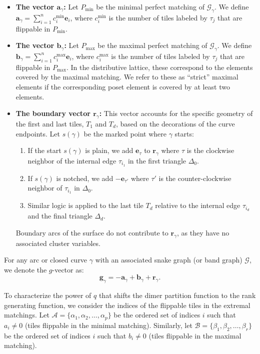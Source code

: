 \documentclass[11pt]{amsart}
\theoremstyle{definition}
\theoremstyle{remark}
\numberwithin{equation}{section}
\begin{document}
\begin{itemize}
    \item \textbf{The vector $\mathbf{a}_\gamma$:} Let $P_{\text{min}}$ be the minimal perfect matching of $\mathcal{G}_\gamma$. We define $\mathbf{a}_\gamma = \sum_{i=1}^n c_i^{\min} \mathbf{e}_i$, where $c_i^{\min}$ is the number of tiles labeled by $\tau_j$ that are flippable in $P_{\text{min}}$.

    \item \textbf{The vector $\mathbf{b}_\gamma$:} Let $P_{\text{max}}$ be the maximal perfect matching of $\mathcal{G}_\gamma$. We define $\mathbf{b}_\gamma = \sum_{i=1}^n c_i^{\max} \mathbf{e}_i$, where $c_i^{\max}$ is the number of tiles labeled by $\tau_j$ that are flippable in $P_{\text{max}}$. In the distributive lattice, these correspond to the elements covered by the maximal matching. We refer to these as ``strict'' maximal elements if the corresponding poset element is covered by at least two elements.

    \item \textbf{The boundary vector $\mathbf{r}_\gamma$:} This vector accounts for the specific geometry of the first and last tiles, $T_1$ and $T_d$, based on the decorations of the curve endpoints. Let $s(\gamma)$ be the marked point where $\gamma$ starts:
    \begin{enumerate}
        \item If the start $s(\gamma)$ is plain, we add $\mathbf{e}_\tau$ to $\mathbf{r}_\gamma$ where $\tau$ is the clockwise neighbor of the internal edge $\tau_{i_1}$ in the first triangle $\Delta_0$.
        \item If $s(\gamma)$ is notched, we add $-\mathbf{e}_{\tau'}$ where $\tau'$ is the counter-clockwise neighbor of $\tau_{i_1}$ in $\Delta_0$.
        \item Similar logic is applied to the last tile $T_d$ relative to the internal edge $\tau_{i_d}$ and the final triangle $\Delta_d$.
    \end{enumerate}
    Boundary arcs of the surface do not contribute to $\mathbf{r}_\gamma$, as they have no associated cluster variables.
\end{itemize}

For any arc or closed curve $\gamma$ with an associated snake graph (or band graph) $\mathcal{G}$, we denote the $g$-vector as:
\[\mathbf{g}_\gamma = -\mathbf{a}_\gamma + \mathbf{b}_\gamma + \mathbf{r}_\gamma.\]

To characterize the power of $q$ that shifts the dimer partition function to the rank generating function, we consider the indices of the flippable tiles in the extremal matchings. Let $\mathcal{A} = \{\alpha_1, \alpha_2, \dots, \alpha_p\}$ be the ordered set of indices $i$ such that $a_i \neq 0$ (tiles flippable in the minimal matching). Similarly, let $\mathcal{B} = \{\beta_1, \beta_2, \dots, \beta_r\}$ be the ordered set of indices $i$ such that $b_i \neq 0$ (tiles flippable in the maximal matching).
\end{document}
